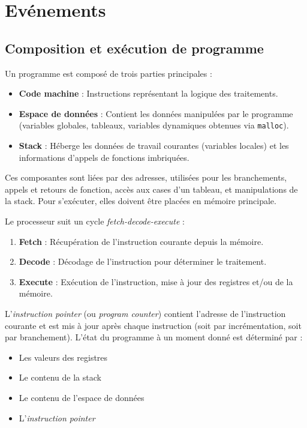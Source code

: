 \section{Evénements}\label{sec:evenements}
\subsection{Composition et exécution de programme}

Un programme est composé de trois parties principales :
\begin{itemize}
    \item \textbf{Code machine} : Instructions représentant la logique des traitements.
    \item \textbf{Espace de données} : Contient les données manipulées par le programme (variables globales, tableaux, variables dynamiques obtenues via \texttt{malloc}).
    \item \textbf{Stack} : Héberge les données de travail courantes (variables locales) et les informations d'appels de fonctions imbriquées.
\end{itemize}

Ces composantes sont liées par des adresses, utilisées pour les branchements, appels et retours de fonction, accès aux cases d'un tableau, et manipulations de la stack. Pour s'exécuter, elles doivent être placées en mémoire principale.

Le processeur suit un cycle \textit{fetch-decode-execute} :
\begin{enumerate}
    \item \textbf{Fetch} : Récupération de l'instruction courante depuis la mémoire.
    \item \textbf{Decode} : Décodage de l'instruction pour déterminer le traitement.
    \item \textbf{Execute} : Exécution de l'instruction, mise à jour des registres et/ou de la mémoire.
\end{enumerate}

L'\textit{instruction pointer} (ou \textit{program counter}) contient l'adresse de l'instruction courante et est mis à jour après chaque instruction (soit par incrémentation, soit par branchement). L'état du programme à un moment donné est déterminé par :
\begin{itemize}
    \item Les valeurs des registres
    \item Le contenu de la stack
    \item Le contenu de l'espace de données
    \item L'\textit{instruction pointer}
\end{itemize}

